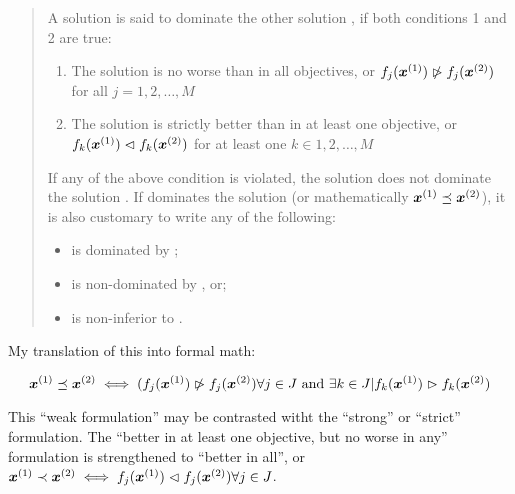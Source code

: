 \begin{quote}
  A solution  is said to dominate the other solution , if both conditions 1 and 2 are true:
  \begin{enumerate}
  \item The solution  is no worse than  in all objectives, or $f_j(\boldsymbol{x}^{(1)}) \ntriangleright f_j(\boldsymbol{x}^{(2)})$ for all $j = 1,2,\ldots,M$
  \item The solution  is strictly better than  in at least one objective, or $f_k(\boldsymbol{x}^{(1)}) \vartriangleleft f_k(\boldsymbol{x}^{(2)})$ for at least one $k \in {1, 2,\ldots,M}$
\end{enumerate}

  If any of the above condition is violated, the solution  does not dominate the solution .
  If  dominates the solution  (or mathematically $\boldsymbol{x}^{(1)} \preceq \boldsymbol{x}^{(2)}$), it is also customary to write any of the following:
  \begin{itemize}
  \item {} is dominated by ;
  \item {} is non-dominated by , or;
  \item {} is non-inferior to .
  \end{itemize}
\end{quote}

My translation of this into formal math:

\begin{equation}
  \label{eq:3}
  \boldsymbol{x}^{(1)} \preceq \boldsymbol{x}^{(2)} \iff ( f_j(\boldsymbol{x}^{(1)}) \ntriangleright f_j(\boldsymbol{x}^{(2)}) \forall j \in J \textrm{~and~} \exists k \in J | f_k(\boldsymbol{x}^{(1)}) \vartriangleright f_k(\boldsymbol{x}^{(2)})
\end{equation}

This ``weak formulation'' may be contrasted witht the ``strong'' or ``strict'' formulation.
The ``better in at least one objective, but no worse in any'' formulation is strengthened to ``better in all'', or $\boldsymbol{x}^{(1)} \prec \boldsymbol{x}^{(2)} \iff f_j(\boldsymbol{x}^{(1)}) \vartriangleleft f_j(\boldsymbol{x}^{(2)}) \forall j \in J$.

